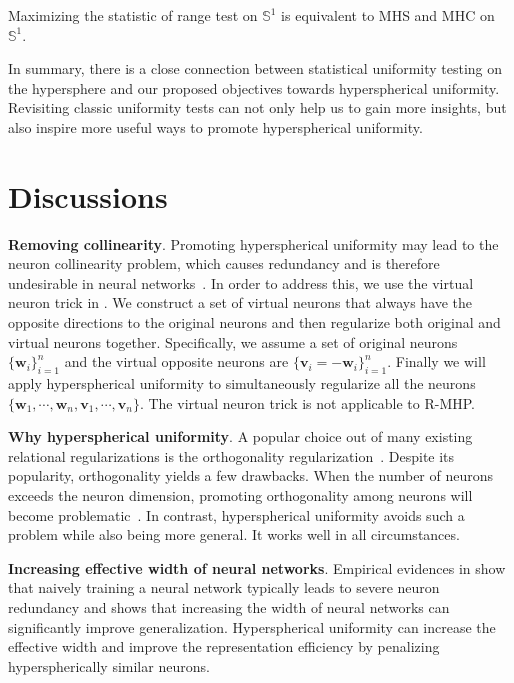 \begin{proposition}\label{range_test}
Maximizing the statistic of range test on $\mathbb{S}^1$ is equivalent to MHS and MHC on $\mathbb{S}^1$.
\end{proposition}

In summary, there is a close connection between statistical uniformity testing on the hypersphere and our proposed objectives towards hyperspherical uniformity. Revisiting classic uniformity tests can not only help us to gain more insights, but also inspire more useful ways to promote hyperspherical uniformity.

\section{Discussions}

\textbf{Removing collinearity}. Promoting hyperspherical uniformity may lead to the neuron collinearity problem, which causes redundancy and is therefore undesirable in neural networks~\cite{roychowdhury2018reducing,shang2016understanding}. In order to address this, we use the virtual neuron trick in \cite{liu2018learning,lyu2017spherical}. We construct a set of virtual neurons that always have the opposite directions to the original neurons and then regularize both original and virtual neurons together. Specifically, we assume a set of original neurons $\{\bm{w}_i\}_{i=1}^n$ and the virtual opposite neurons are $\{\bm{v}_i=-\bm{w}_i\}_{i=1}^n$. Finally we will apply hyperspherical uniformity to simultaneously regularize all the neurons $\{\bm{w}_1,\cdots,\bm{w}_n,\bm{v}_1,\cdots,\bm{v}_n\}$. The virtual neuron trick is not applicable to R-MHP.

\textbf{Why hyperspherical uniformity}. A popular choice out of many existing relational regularizations is the orthogonality regularization~\cite{brock2016neural,liu2017hyper,bansal2018can,huang2018orthogonal,jia2019orthogonal,qi2020deep}. Despite its popularity, orthogonality yields a few drawbacks. When the number of neurons exceeds the neuron dimension, promoting orthogonality among neurons will become problematic~\cite{liu2018learning}. In contrast, hyperspherical uniformity avoids such a problem while also being more general. It works well in all circumstances.

\textbf{Increasing effective width of neural networks}. Empirical evidences in \cite{roychowdhury2018reducing,shang2016understanding,han2015deep,han2015learning} show that naively training a neural network typically leads to severe neuron redundancy and \cite{zagoruyko2016wide} shows that increasing the width of neural networks can significantly improve generalization. Hyperspherical uniformity can increase the effective width and improve the representation efficiency by penalizing hyperspherically similar neurons.

